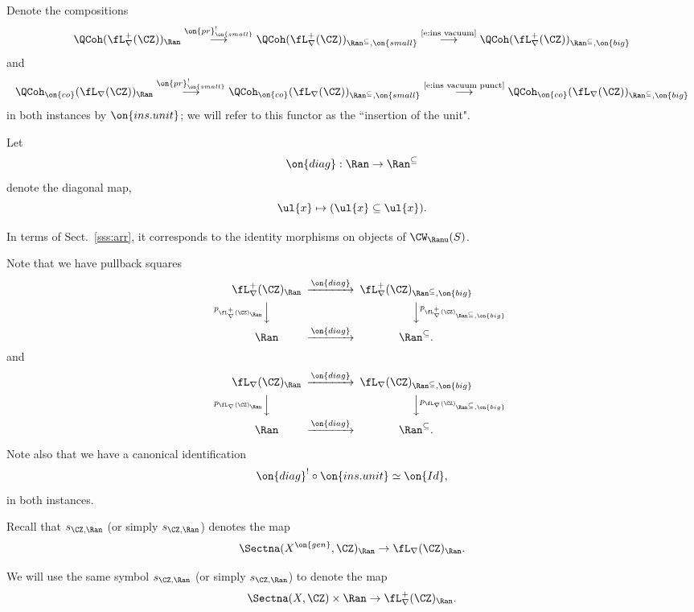 \documentclass[9pt]{amsart}
\theoremstyle{remark}
\theoremstyle{definition}
\theoremstyle{remark}
\newcommand{\secref}[1]{Sect.~\ref{#1}}
\numberwithin{equation}{section}
\begin{document}
Denote the compositions
$$\QCoh(\fL^+_\nabla(\CZ))_\Ran \overset{\on{pr}_{\on{small}}^!}\longrightarrow 
\QCoh(\fL^+_\nabla(\CZ))_{\Ran^{\subseteq},\on{small}} 
\overset{\text{\eqref{e:ins vacuum}}}\longrightarrow \QCoh(\fL^+_\nabla(\CZ))_{\Ran^{\subseteq},\on{big}}$$
and 
$$\QCoh_{\on{co}}(\fL_\nabla(\CZ))_\Ran \overset{\on{pr}_{\on{small}}^!}\longrightarrow 
\QCoh_{\on{co}}(\fL_\nabla(\CZ))_{\Ran^{\subseteq},\on{small}} \overset{\text{\eqref{e:ins vacuum punct}}}\longrightarrow \QCoh_{\on{co}}(\fL_\nabla(\CZ))_{\Ran^{\subseteq},\on{big}}$$
in both instances 
by $\on{ins.unit}$; we will refer to this functor as the ``insertion of the unit".

\sssec{}

Let 
$$\on{diag}:\Ran\to \Ran^{\subseteq}$$ denote the diagonal map,
$$\ul{x}\mapsto (\ul{x}\subseteq \ul{x}).$$

In terms of \secref{sss:arr}, it corresponds to the identity morphisms
on objects of $\CW_\Ranu(S)$.

\medskip

Note that we have pullback squares
\begin{equation} \label{e:diag sq non-punct}
\CD
\fL^+_\nabla(\CZ)_\Ran @>{\on{diag}}>> \fL^+_\nabla(\CZ)_{\Ran^{\subseteq},\on{big}} \\
@V{p_{\fL_\nabla^+(\CZ)_\Ran}}VV @VV{p_{\fL^+_\nabla(\CZ)_{\Ran^{\subseteq},\on{big}}}}V \\
\Ran @>{\on{diag}}>> \Ran^{\subseteq}. 
\endCD
\end{equation}
and 
\begin{equation} \label{e:diag sq}
\CD
\fL_\nabla(\CZ)_\Ran @>{\on{diag}}>> \fL_\nabla(\CZ)_{\Ran^{\subseteq},\on{big}} \\
@V{p_{\fL_\nabla(\CZ)_\Ran}}VV @VV{p_{\fL_\nabla(\CZ)_{\Ran^{\subseteq},\on{big}}}}V \\
\Ran @>{\on{diag}}>> \Ran^{\subseteq}. 
\endCD
\end{equation}

Note also that we have a canonical identification
$$\on{diag}^!\circ \on{ins.unit}\simeq \on{Id},$$
in both instances. 

\sssec{}

Recall that $s_{\CZ,\Ran}$ (or simply $s_{\CZ,\Ran}$) denotes the map
$$\Sectna(X^{\on{gen}},\CZ)_\Ran\to \fL_\nabla(\CZ)_\Ran.$$

We will use the same symbol $s_{\CZ,\Ran}$ (or simply $s_{\CZ,\Ran}$) to denote the map 
$$\Sectna(X,\CZ)\times \Ran\to \fL^+_\nabla(\CZ)_\Ran.$$
\end{document}
